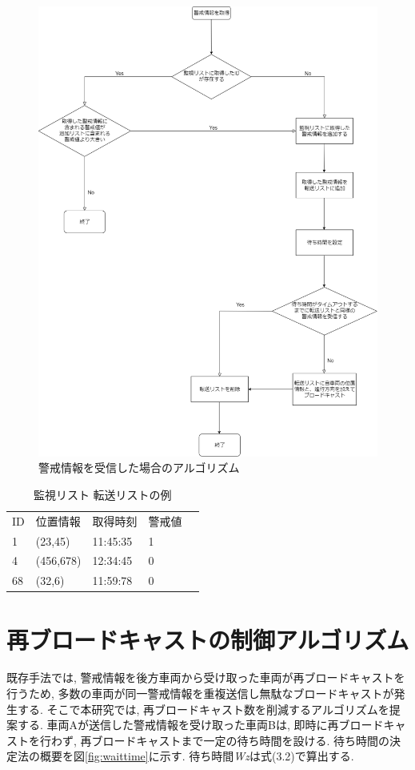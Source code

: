 \documentclass[10pt]{jreport}
\begin{document}
\begin{figure}[H]
\centering
\includegraphics[width=12cm]{figures/receive3_2_2.png}
\caption{警戒情報を受信した場合のアルゴリズム}
\label{fig:receive}
\end{figure}


\begin{table}[H]
\caption{監視リスト 転送リストの例}
\centering
\begin{tabular}{|l|l|l|l|l}
\cline{1-4}
ID & 位置情報      & 取得時刻     & 警戒値 &  \\ \cline{1-4}
1  & (23,45)   & 11:45:35 & 1   &  \\ \cline{1-4}
4  & (456,678) & 12:34:45 & 0   &  \\ \cline{1-4}
68 & (32,6)    & 11:59:78 & 0   &  \\ \cline{1-4}
\end{tabular}
\end{table}


 
\section{再ブロードキャストの制御アルゴリズム}
既存手法では, 警戒情報を後方車両から受け取った車両が再ブロードキャストを行うため, 多数の車両が同一警戒情報を重複送信し無駄なブロードキャストが発生する. そこで本研究では, 再ブロードキャスト数を削減するアルゴリズムを提案する. 
 車両Aが送信した警戒情報を受け取った車両Bは, 即時に再ブロードキャストを行わず, 再ブロードキャストまで一定の待ち時間を設ける. 待ち時間の決定法の概要を図\ref{fig:waittime}に示す. 待ち時間{\it Wz}は式(3.2)で算出する. 
 
\end{document}
